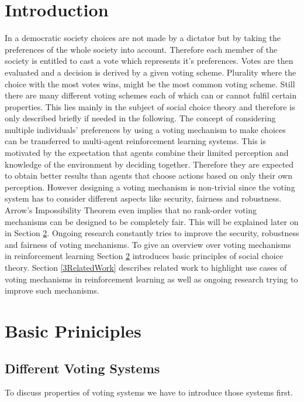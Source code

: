 \documentclass[conference]{IEEEtran}
\begin{document}
\section{Introduction}
In a democratic society choices are not made by a dictator but by taking the preferences of the whole society into account. Therefore each member of the society is entitled to cast a vote which represents it's preferences. Votes are then evaluated and a decision is derived by a given voting scheme. Plurality where the choice with the most votes wins, might be the most common voting scheme. Still there are many different voting schemes each of which can or cannot fulfil certain properties. This lies mainly in the subject of social choice theory and therefore is only described briefly if needed in the following.
\newline
The concept of considering multiple individuals' preferences by using a voting mechanism to make choices can be transferred to multi-agent reinforcement learning systems. This is motivated by the expectation that agents combine their limited perception and knowledge of the environment by deciding together. Therefore they are expected to obtain better results than agents that choose actions based on only their own perception.\cite{partalas2008hybrid}
\newline
However designing a voting mechanism is non-trivial since the voting system has to consider different aspects like security, fairness and robustness\cite{pitt2006voting}.
Arrow's Impossibility Theorem even implies that no rank-order voting mechanisms can be designed to be completely fair. This will be explained later on in Section \ref{2BasicPrinciples}.
Ongoing research constantly tries to improve the security, robustness and fairness of voting mechanisms.
\newline
To give an overview over voting mechanisms in reinforcement learning Section \ref{2BasicPrinciples} introduces basic principles of social choice theory.
Section \ref{3RelatedWork} describes related work to highlight use cases of voting mechanisms in reinforcement learning as well as ongoing research trying to improve such mechanisms.

\section{Basic Priniciples}\label{2BasicPrinciples}

\subsection{Different Voting Systems}
To discuss properties of voting systems we have to introduce those systems first.
\end{document}
